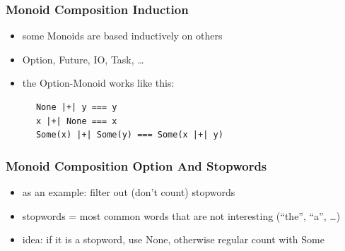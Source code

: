 \documentclass[aspectratio=169]{beamer}
\begin{document}
\begin{frame}[fragile]
  \frametitle{Monoid Composition \textemdash{} Induction}
  \begin{itemize}
  \item some Monoids are based inductively on others
  \item Option, Future, IO, Task, \ldots{}
  \item the Option-Monoid works like this:
  \end{itemize}
  \begin{center}
    \vspace{1cm}
    \begin{verbatim}
      None |+| y === y
      x |+| None === x
      Some(x) |+| Some(y) === Some(x |+| y)
    \end{verbatim}
  \end{center}
\end{frame}

\begin{frame}[fragile]
  \frametitle{Monoid Composition \textemdash{} Option And Stopwords}
  \begin{itemize}
  \item as an example: filter out (don't count) stopwords
  \item stopwords = most common words that are not interesting (``the'', ``a'', \ldots{})
  \item idea: if it is a stopword, use None, otherwise regular count with Some
  \end{itemize}
\end{frame}
\end{document}
